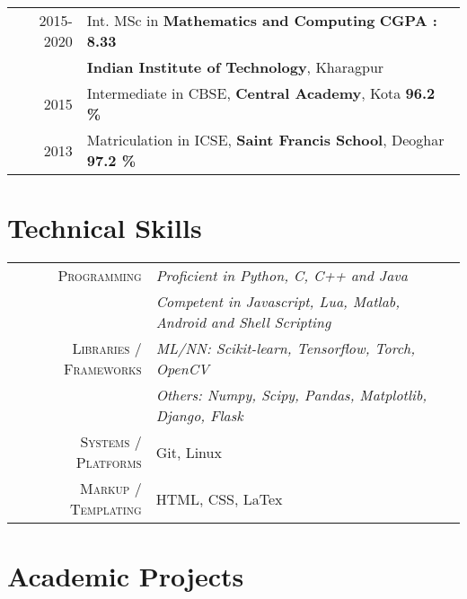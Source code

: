 \documentclass[a4paper,10pt]{extarticle} %
\begin{document}
\begin{tabular}{r|p{18cm}}	
2015-2020 & Int. MSc in \textbf{Mathematics and Computing} \hfill{\textbf{CGPA : 8.33}}\\
&\textbf{Indian Institute of Technology}, Kharagpur\\
2015 & Intermediate in CBSE, \textbf{Central Academy}, Kota  \hfill{\textbf{96.2 \%}}\\
2013 & Matriculation in ICSE, \textbf{Saint Francis School}, Deoghar  \hfill{\textbf{97.2 \%}}
\end{tabular}


\section{Technical Skills}

\begin{tabular}{r|p{18cm}}
\textsc{Programming} & \itshape{Proficient in} Python, C, C++ and Java\\ & \itshape{Competent in} Javascript, Lua, Matlab, Android and Shell Scripting \\
\textsc{Libraries / Frameworks} & \itshape{ML/NN: }Scikit-learn, Tensorflow, Torch, OpenCV\\
& \itshape{Others: }Numpy, Scipy, Pandas, Matplotlib, Django, Flask\\
\textsc{Systems / Platforms} & Git, Linux\\
\textsc{Markup / Templating} & HTML, CSS, LaTex
\end{tabular}


\section{Academic Projects}
\end{document}
